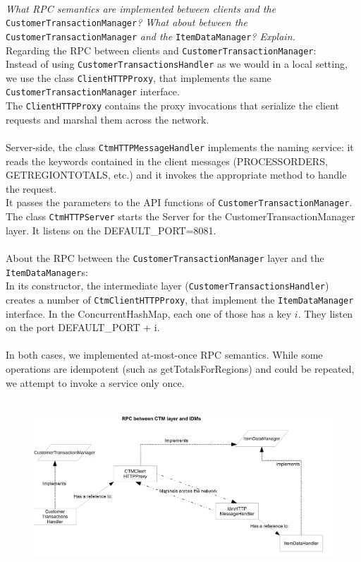 \documentclass[paper=a4, fontsize=11pt]{scrartcl} %
\numberwithin{equation}{section} %
\numberwithin{figure}{section} %
\numberwithin{table}{section} %
\begin{document}
~\\
\textit{What RPC semantics are implemented between clients and the }\verb|CustomerTransactionManager|\textit{? What about between the} \verb|CustomerTransactionManager|\textit{ and the }\verb|ItemDataManager|\textit{? Explain.}
~\\
Regarding the RPC between clients and \verb|CustomerTransactionManager|:\\
Instead of using \verb|CustomerTransactionsHandler| as we would in a local setting, we use the class \verb|ClientHTTPProxy|, that implements the same \verb|CustomerTransactionManager| interface.\\
The \verb|ClientHTTPProxy| contains the proxy invocations that serialize the client requests and marshal them across the network.\\
~\\
Server-side, the class \verb|CtmHTTPMessageHandler| implements the naming service: it reads the keywords contained in the client messages (PROCESSORDERS, GETREGIONTOTALS, etc.) and it invokes the appropriate method to handle the request. \\
It passes the parameters to the API functions of \verb|CustomerTransactionManager|.
~\\
The class \verb|CtmHTTPServer| starts the Server for the CustomerTransactionManager layer. It listens on the DEFAULT\_PORT=8081.\\
~\\
About the RPC between the \verb|CustomerTransactionManager| layer and the \verb|ItemDataManager|s:\\
In its constructor, the intermediate layer (\verb|CustomerTransactionsHandler|) creates a number of \verb|CtmClientHTTPProxy|, that implement the \verb|ItemDataManager| interface. In the ConcurrentHashMap, each one of those has a key $i$. They listen on the port DEFAULT\_PORT + i.\\
~\\
In both cases, we implemented at-most-once RPC semantics. While some operations are idempotent (such as getTotalsForRegions) and could be repeated, we attempt to invoke a service only once.\\ 
~\\
\begin{figure}[h]
	 \includegraphics[width=1.0\textwidth,center]{RPC.png}
\end{figure}
\end{document}
